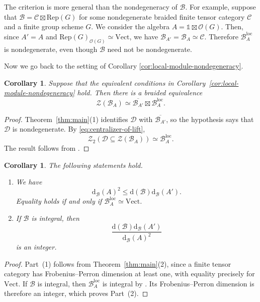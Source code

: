 \documentclass[10pt,a4paper]{amsart}
\numberwithin{equation}{section}
\newtheorem{corollary}[thmctr]{Corollary}
\newcommand{\unit}{\mathds{1}}
\newcommand{\B}{\mathcal{B}}
\newcommand{\C}{\mathcal{C}}
\newcommand{\D}{\mathcal{D}}
\newcommand{\Z}{\mathcal{Z}}
\newcommand{\loc}{\mathrm{loc}}
\newcommand{\FP}{\mathrm{d}}
\newcommand{\Vect}{\mathrm{Vect}}
\begin{document}
The criterion is more general than the nondegeneracy of $\B$. 
For example, suppose that $\B = \C \boxtimes \mathrm{Rep}(G)$ for some nondegenerate braided finite tensor category $\C$ and a finite group scheme $G$. We consider the algebra $A = \unit \boxtimes \mathcal{O}(G)$. Then, since $A'=A$ and $\mathrm{Rep}(G)_{\mathcal{O}(G)} \simeq \Vect$, we have $\B_{A'} = \B_A \simeq \C$. Therefore $\B_A^{\loc}$ is nondegenerate, even though $\B$ need not be nondegenerate.

Now we go back to the setting of Corollary \ref{cor:local-module-nondegeneracy}.

\begin{corollary}\label{cor:local-module-factorization}
Suppose that the equivalent conditions in
Corollary~\ref{cor:local-module-nondegeneracy} hold. Then there is a braided
equivalence
\[
  \Z(\B_A)
  \simeq
  \overline{\B_{A'}}\boxtimes\B_A^{\loc}.
\]
\end{corollary}

\begin{proof}
Theorem~\ref{thm:main}(1) identifies $\D$ with
$\overline{\B_{A'}}$, so the hypothesis says that $\D$ is nondegenerate.
By \eqref{eq:centralizer-of-lift},
\[
  \Z_2(\D\subseteq\Z(\B_A))\simeq\B_A^{\loc}.
\]
The result follows from
\cite[Theorem~4.17]{laugwitz2022relative}.
\end{proof}

\begin{corollary}\label{cor:local-module-numerical-consequences}
The following statements hold.
\begin{enumerate}
  \item We have
  \[
    \FP_{\B}(A)^2
    \leq
    \FP(\B)\FP_{\B}(A').
  \]
  Equality holds if and only if $\B_A^{\loc}\simeq\Vect$.
  \item If $\B$ is integral, then
  \[
    \frac{\FP(\B)\FP_{\B}(A')}{\FP_{\B}(A)^2}
  \]
  is an integer.
\end{enumerate}
\end{corollary}

\begin{proof}
Part~(1) follows from Theorem~\ref{thm:main}(2), since a finite tensor
category has Frobenius--Perron dimension at least one, with equality precisely
for $\Vect$. If $\B$ is integral, then $\B_A^{\loc}$ is integral by
\cite[Lemma~5.16]{shimizu2026commutative}. Its Frobenius--Perron dimension is
therefore an integer, which proves Part~(2).
\end{proof}
\end{document}
